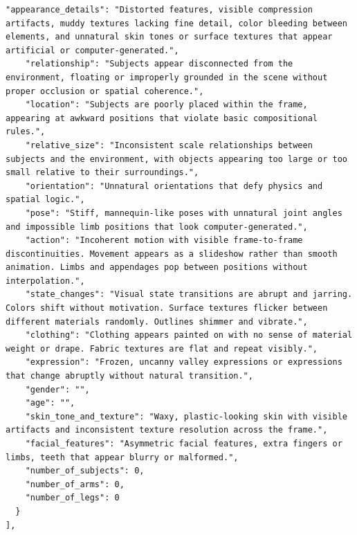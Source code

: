 \begin{tcolorbox}
\begin{Verbatim}[breaklines=true,breakanywhere=true,fontsize=\scriptsize]
    "appearance_details": "Distorted features, visible compression artifacts, muddy textures lacking fine detail, color bleeding between elements, and unnatural skin tones or surface textures that appear artificial or computer-generated.",
    "relationship": "Subjects appear disconnected from the environment, floating or improperly grounded in the scene without proper occlusion or spatial coherence.",
    "location": "Subjects are poorly placed within the frame, appearing at awkward positions that violate basic compositional rules.",
    "relative_size": "Inconsistent scale relationships between subjects and the environment, with objects appearing too large or too small relative to their surroundings.",
    "orientation": "Unnatural orientations that defy physics and spatial logic.",
    "pose": "Stiff, mannequin-like poses with unnatural joint angles and impossible limb positions that look computer-generated.",
    "action": "Incoherent motion with visible frame-to-frame discontinuities. Movement appears as a slideshow rather than smooth animation. Limbs and appendages pop between positions without interpolation.",
    "state_changes": "Visual state transitions are abrupt and jarring. Colors shift without motivation. Surface textures flicker between different materials randomly. Outlines shimmer and vibrate.",
    "clothing": "Clothing appears painted on with no sense of material weight or drape. Fabric textures are flat and repeat visibly.",
    "expression": "Frozen, uncanny valley expressions or expressions that change abruptly without natural transition.",
    "gender": "",
    "age": "",
    "skin_tone_and_texture": "Waxy, plastic-looking skin with visible artifacts and inconsistent texture resolution across the frame.",
    "facial_features": "Asymmetric facial features, extra fingers or limbs, teeth that appear blurry or malformed.",
    "number_of_subjects": 0,
    "number_of_arms": 0,
    "number_of_legs": 0
  }
],

\end{Verbatim}
\end{tcolorbox}
